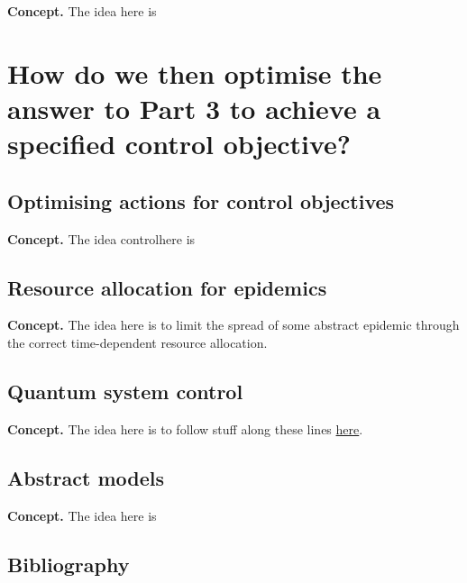 \documentclass{book}
\begin{document}
{\bfseries\sffamily Concept.} The idea here is 


\part*{{ How do we then optimise the answer to Part 3 to achieve a specified control objective?}}


\chapter{\sffamily Optimising actions for control objectives}

{\bfseries\sffamily Concept.} The idea  controlhere is 


\chapter{\sffamily Resource allocation for epidemics}

{\bfseries\sffamily Concept.} The idea here is to limit the spread of some abstract epidemic through the correct time-dependent resource allocation.


\chapter{\sffamily Quantum system control}

{\bfseries\sffamily Concept.} The idea here is to follow stuff along these lines \href{https://arxiv.org/pdf/1210.7127.pdf}{here}.


\chapter{\sffamily Abstract models}

{\bfseries\sffamily Concept.} The idea here is




\backmatter
\chapter*{Bibliography}


\end{document}
